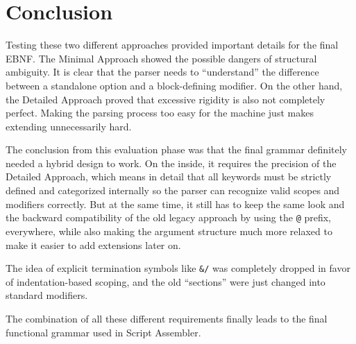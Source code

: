 \section{Conclusion}

Testing these two different approaches provided important details for the final EBNF. The Minimal Approach showed the possible dangers of structural ambiguity. It is clear that the parser needs to ``understand'' the difference between a standalone option and a block-defining modifier. On the other hand, the Detailed Approach proved that excessive rigidity is also not completely perfect. Making the parsing process too easy for the machine just makes extending unnecessarily hard.

The conclusion from this evaluation phase was that the final grammar definitely needed a hybrid design to work. On the inside, it requires the precision of the Detailed Approach, which  means in detail that all keywords must be strictly defined and categorized internally so the parser can recognize valid scopes and modifiers correctly. But at the same time, it still has to keep the same look and the backward compatibility of the old legacy approach by using the \texttt{@} prefix, everywhere, while also making the argument structure much more relaxed to make it easier to add extensions later on.

The idea of explicit termination symbols like \texttt{\&/} was completely dropped in favor of indentation-based scoping, and the old ``sections'' were just changed into standard modifiers.

The combination of all these different requirements finally leads to the final functional grammar used in Script Assembler.
